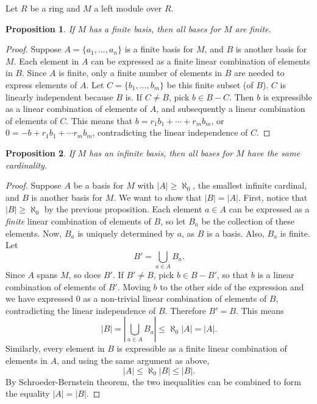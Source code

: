 \documentclass[12pt]{article}
\newtheorem{prop}{Proposition}
\begin{document}
Let $R$ be a ring and $M$ a left module over $R$.

\begin{prop}
If $M$ has a finite basis, then all bases for $M$ are finite.
\end{prop}
\begin{proof}
Suppose $A=\lbrace a_1,\ldots, a_n\rbrace$ is a finite basis for $M$, and $B$ is another basis for $M$.  Each element in $A$ can be expressed as a finite linear combination of elements in $B$.  Since $A$ is finite, only a finite number of elements in $B$ are needed to express elements of $A$.  Let $C=\lbrace b_1,\ldots,b_m\rbrace$ be this finite subset (of $B$).  $C$ is linearly independent because $B$ is.  If $C\ne B$, pick $b\in B-C$.  Then $b$ is expressible as a linear combination of elements of $A$, and subsequently a linear combination of elements of $C$.  This means that $b=r_1b_1+\cdots +r_mb_m$, or $0=-b+r_1b_1+\cdots r_mb_m$, contradicting the linear independence of $C$.
\end{proof}

\begin{prop}
If $M$ has an infinite basis, then all bases for $M$ have the same cardinality.
\end{prop}
\begin{proof}
Suppose $A$ be a basis for $M$ with $|A| \ge \aleph_0$, the smallest infinite cardinal, and $B$ is another basis for $M$.  We want to show that $|B|=|A|$.  First, notice that $|B|\ge \aleph_0$ by the previous proposition.  Each element $a\in A$ can be expressed as a \emph{finite} linear combination of elements of $B$, so let $B_a$ be the collection of these elements.  Now, $B_a$ is uniquely determined by $a$, as $B$ is a basis.  Also, $B_a$ is finite.  Let $$B'=\bigcup_{a\in A} B_a.$$  Since $A$ spans $M$, so does $B'$.  If $B'\ne B$, pick $b\in B-B'$, so that $b$ is a linear combination of elements of $B'$.  Moving $b$ to the other side of the expression and we have expressed $0$ as a non-trivial linear combination of elements of $B$, contradicting the linear independence of $B$.  Therefore $B'=B$.  This means $$|B|= \left|\bigcup_{a\in A} B_a\right| \le \aleph_0 |A| = |A|.$$
Similarly, every element in $B$ is expressible as a finite linear combination of elements in $A$, and using the same argument as above, $$|A|\le \aleph_0 |B| \le |B|.$$  By Schroeder-Bernstein theorem, the two inequalities can be combined to form the equality $|A|=|B|$.
\end{proof}
\end{document}
